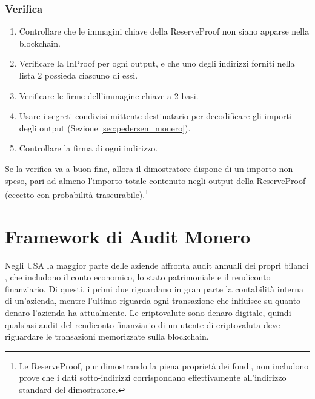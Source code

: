 
\subsubsection*{Verifica}

\begin{enumerate}
    \item Controllare che le immagini chiave della ReserveProof non siano apparse nella blockchain.
    \item Verificare la InProof per ogni output, e che uno degli indirizzi forniti nella lista 2 possieda ciascuno di essi.
    \item Verificare le firme dell'immagine chiave a 2 basi.
    \item Usare i segreti condivisi mittente-destinatario per decodificare gli importi degli output (Sezione \ref{sec:pedersen_monero}).
    \item Controllare la firma di ogni indirizzo.
\end{enumerate}{}

Se la verifica va a buon fine, allora il dimostratore dispone di un importo non speso, pari ad almeno l'importo totale contenuto negli output della ReserveProof (eccetto con probabilità trascurabile).\footnote{Le ReserveProof, pur dimostrando la piena proprietà dei fondi, non includono prove che i dati sotto-indirizzi corrispondano effettivamente all'indirizzo standard del dimostratore.}



\section{Framework di Audit Monero}
\label{sec:proofs-monero-audit-framework}

Negli USA la maggior parte delle aziende affronta audit annuali dei propri bilanci \cite{investopedia-audits}, che includono il conto economico, lo stato patrimoniale e il rendiconto finanziario. Di questi, i primi due riguardano in gran parte la contabilità interna di un'azienda, mentre l'ultimo riguarda ogni transazione che influisce su quanto denaro l'azienda ha attualmente. Le criptovalute sono denaro digitale, quindi qualsiasi audit del rendiconto finanziario di un utente di criptovaluta deve riguardare le transazioni memorizzate sulla blockchain.

